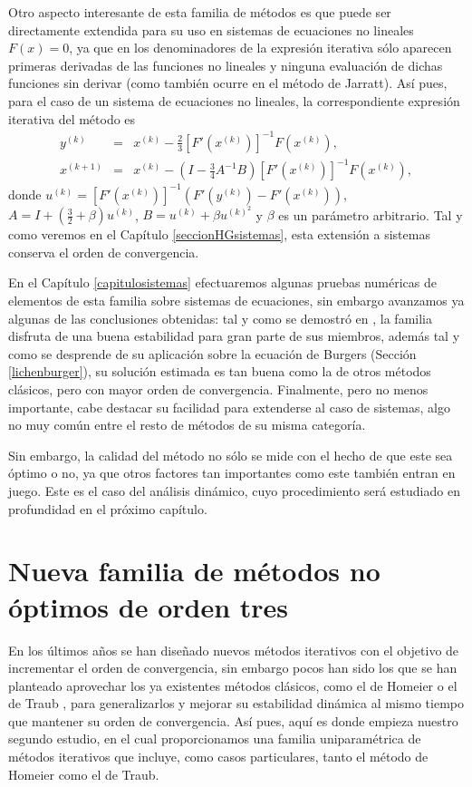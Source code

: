 Otro aspecto interesante de esta familia de métodos es que puede ser directamente extendida para su uso en sistemas de ecuaciones no lineales $F(x)=0$, ya que en los denominadores de la expresión iterativa sólo aparecen primeras derivadas de las funciones no lineales y ninguna evaluación de dichas funciones sin derivar (como también ocurre en el método de Jarratt). Así pues, para el caso de un sistema de ecuaciones no lineales, la correspondiente expresión iterativa del método es
\begin{eqnarray}\label{s1ecuaciones}
y^{(k)} &=& x^{(k)} - \frac{2}{3}[F'(x^{(k)})]^{-1}F(x^{(k)}),\nonumber\\
x^{(k + 1)}& =& x^{(k)} - \left(I - \frac{3}{4}A^{-1}
B\right)[F'(x^{(k)})]^{-1}F(x^{(k)}),
\end{eqnarray}
donde $u ^{(k)} = [F'(x^{(k)})]^{-1}\left(F'(y^{(k)}) -
F'(x^{(k)})\right)$, $A= I + (\frac{3}{2} + \beta )u^{(k)}$,
$B=u^{(k)} + \beta u^{(k)^2}$ y $\beta$ es un parámetro arbitrario. Tal y como veremos en el Capítulo \ref{seccionHGsistemas}, esta extensión a sistemas conserva el orden de convergencia.

En el Capítulo \ref{capitulosistemas} efectuaremos algunas pruebas numéricas de elementos de esta familia sobre sistemas de ecuaciones, sin embargo avanzamos ya algunas de las conclusiones obtenidas: tal y como se demostró en \cite{napoles}, la familia disfruta de una buena estabilidad para gran parte de sus miembros, además tal y como se desprende de su aplicación sobre la ecuación de Burgers (Sección \ref{lichenburger}), su solución estimada es tan buena como la de otros métodos clásicos, pero con mayor orden de convergencia. Finalmente, pero no menos importante, cabe destacar su facilidad para extenderse al caso de sistemas, algo no muy común entre el resto de métodos de su misma categoría.

Sin embargo, la calidad del método no sólo se mide con el hecho de que este sea óptimo o no, ya que otros factores tan importantes como este también entran en juego. Este es el caso del análisis dinámico, cuyo procedimiento será estudiado en profundidad en el próximo capítulo.

\section{Nueva familia de métodos no óptimos de orden tres}\label{seccionHG}
En los últimos años se han diseñado nuevos métodos iterativos con el objetivo de incrementar el orden de convergencia, sin embargo pocos han sido los que se han planteado aprovechar los ya existentes métodos clásicos, como el de Homeier \cite{Ho} o el de Traub \cite{TR}, para generalizarlos y mejorar su estabilidad dinámica al mismo tiempo que mantener su orden de convergencia. Así pues, aquí es donde empieza nuestro segundo estudio, en el cual proporcionamos una familia uniparamétrica de métodos iterativos que incluye, como casos particulares, tanto el método de Homeier como el de Traub.


